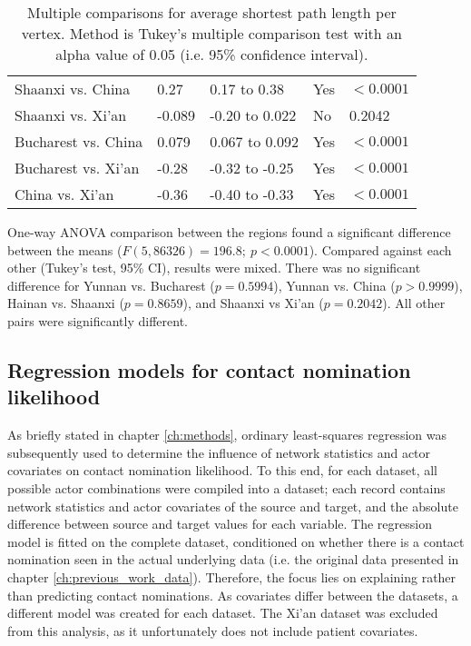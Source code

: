 \begin{table}[h]
\begin{mdframed}
\begin{tabular*}{\linewidth}{l|llll}
			Shaanxi vs. China & 0.27 & 0.17 to 0.38 & Yes & $<0.0001$\\
			Shaanxi vs. Xi'an & -0.089 & -0.20 to 0.022 & No & 0.2042\\
			Bucharest vs. China & 0.079 & 0.067 to 0.092 & Yes & $<0.0001$\\
			Bucharest vs. Xi'an & -0.28 & -0.32 to -0.25 & Yes & $<0.0001$\\
			China vs. Xi'an & -0.36 & -0.40 to -0.33 & Yes & $<0.0001$\\
			\hline
		\end{tabular*}
		\caption{Multiple comparisons for average shortest path length per vertex. Method is Tukey's multiple comparison test with an alpha value of 0.05 (i.e. 95\% confidence interval).}
		\label{tab:avg_shortest_path_tukey}
	\end{mdframed}
\end{table}

One-way ANOVA comparison between the regions found a significant difference between the means ($F(5,86326)=196.8; \: p<0.0001$). Compared against each other (Tukey's test, 95\% CI), results were mixed. There was no significant difference for Yunnan vs. Bucharest ($p=0.5994$), Yunnan vs. China ($p>0.9999$), Hainan vs. Shaanxi ($p=0.8659$), and Shaanxi vs Xi'an ($p=0.2042$). All other pairs were significantly different.

\subsection{Regression models for contact nomination likelihood}
\label{sec:sna_regression}

As briefly stated in chapter \ref{ch:methods}, ordinary least-squares regression was subsequently used to determine the influence of network statistics and actor covariates on contact nomination likelihood. To this end, for each dataset, all possible actor combinations were compiled into a dataset; each record contains network statistics and actor covariates of the source and target, and the absolute difference between source and target values for each variable. The regression model is fitted on the complete dataset, conditioned on whether there is a contact nomination seen in the actual underlying data (i.e. the original data presented in chapter \ref{ch:previous_work_data}). Therefore, the focus lies on explaining rather than predicting contact nominations. As covariates differ between the datasets, a different model was created for each dataset. The Xi'an dataset was excluded from this analysis, as it unfortunately does not include patient covariates.

